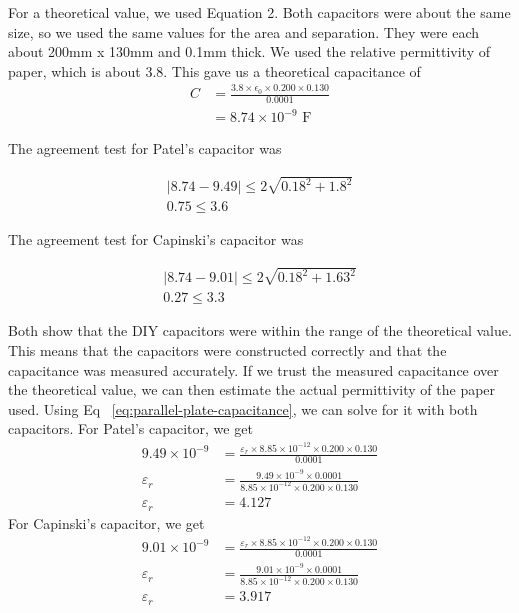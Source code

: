\documentclass[11pt]{article}
\begin{document}
    For a theoretical value, we used Equation 2.
    Both capacitors were about the same size, so we used the same values for the area and separation.
    They were each about 200mm x 130mm and 0.1mm thick.
    We used the relative permittivity of paper, which is about 3.8.
    This gave us a theoretical capacitance of
    \begin{align*}
        C &= \frac{3.8 \times \epsilon_0 \times 0.200 \times 0.130}{0.0001} \\
        &= 8.74 \times 10^{-9} \text{ F}
    \end{align*}

    The agreement test for Patel's capacitor was
    \begin{e}
        \begin{align*}
            |8.74 - 9.49| \le 2 \sqrt{0.18^2 + 1.8^2} \\
            0.75 \le 3.6
        \end{align*}
    \end{e}

    The agreement test for Capinski's capacitor was
    \begin{e}
        \begin{align*}
            |8.74 - 9.01| \le 2 \sqrt{0.18^2 + 1.63^2} \\
            0.27 \le 3.3
        \end{align*}
    \end{e}

    Both show that the DIY capacitors were within the range of the theoretical value.
    This means that the capacitors were constructed correctly and that the capacitance was measured accurately.
    If we trust the measured capacitance over the theoretical value, we can then estimate the actual permittivity of the paper used.
    Using Eq ~\ref{eq:parallel-plate-capacitance}, we can solve for it with both capacitors.
    For Patel's capacitor, we get
    \begin{align*}
        9.49 \times 10^{-9} &= \frac{\varepsilon_r \times 8.85 \times 10^{-12} \times 0.200 \times 0.130}{0.0001} \\
        \varepsilon_r &= \frac{9.49 \times 10^{-9} \times 0.0001}{8.85 \times 10^{-12} \times 0.200 \times 0.130} \\
        \varepsilon_r &= 4.127
    \end{align*}
    For Capinski's capacitor, we get
    \begin{align*}
        9.01 \times 10^{-9} &= \frac{\varepsilon_r \times 8.85 \times 10^{-12} \times 0.200 \times 0.130}{0.0001} \\
        \varepsilon_r &= \frac{9.01 \times 10^{-9} \times 0.0001}{8.85 \times 10^{-12} \times 0.200 \times 0.130} \\
        \varepsilon_r &= 3.917
    \end{align*}
\end{document}
